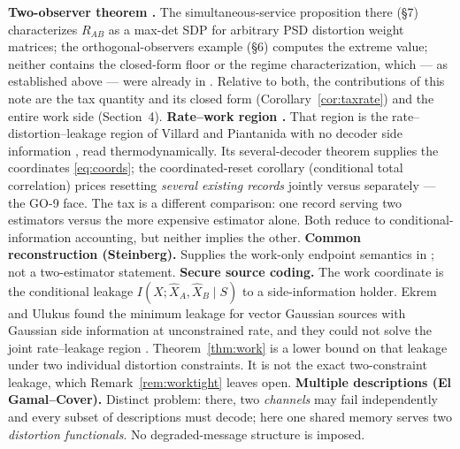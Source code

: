 \documentclass[11pt]{article}
\newcommand{\hX}{\widehat X}\newcommand{\hY}{\widehat Y}
\begin{document}
\textbf{Two-observer theorem \cite{bondtwoobserver}.} The
simultaneous-service proposition there (\S7) characterizes $R_{AB}$ as a
max-det SDP for arbitrary PSD distortion weight matrices; the orthogonal-observers
example (\S6) computes the extreme value; neither contains the closed-form
floor or the regime characterization, which --- as established above ---
were already in \cite{xiaoluo2005,lapidothtinguely2010,stylianou2021}.
Relative to both, the contributions of this note are the tax quantity and
its closed form (Corollary~\ref{cor:taxrate}) and the entire work side
(Section~4). \textbf{Rate--work region \cite{bondlandauerV}.} That region is
the rate--distortion--leakage region of Villard and Piantanida with no decoder
side information \cite{villard2013}, read thermodynamically. Its
several-decoder theorem supplies the coordinates \eqref{eq:coords}; the
coordinated-reset corollary (conditional total correlation) prices
resetting \emph{several existing records} jointly versus separately --- the
GO-9 face. The tax is a different comparison: one record serving two
estimators versus the more expensive estimator alone. Both reduce to
conditional-information accounting, but neither implies the other.
\textbf{Common reconstruction (Steinberg).} Supplies the work-only endpoint
semantics in \cite{bondlandauerV}; not a two-estimator statement.
\textbf{Secure source coding.} The work coordinate is the conditional leakage
$I(X;\hX_A,\hX_B\mid S)$ to a side-information holder. Ekrem and Ulukus found
the minimum leakage for vector Gaussian sources with Gaussian side information
at unconstrained rate, and they could not solve the joint rate--leakage region
\cite{ekrem2013}. Theorem~\ref{thm:work} is a lower bound on that leakage under
two individual distortion constraints. It is not the exact two-constraint
leakage, which Remark~\ref{rem:worktight} leaves open.
\textbf{Multiple descriptions (El Gamal--Cover).} Distinct problem: there,
two \emph{channels} may fail independently and every subset of descriptions
must decode; here one shared memory serves two \emph{distortion
functionals}. No degraded-message structure is imposed.
\end{document}
